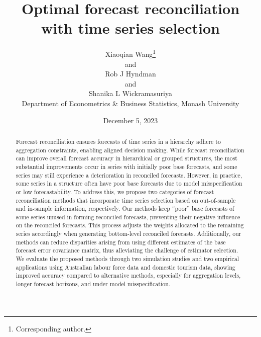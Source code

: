 \documentclass[
  12pt,
  11pt]{article}
\begin{document}
\def\spacingset#1{\renewcommand{\baselinestretch}%
{#1}\small\normalsize} \spacingset{1}

\renewcommand*{\arraystretch}{0.5} %


\date{December 5, 2023}
\title{\bf Optimal forecast reconciliation with time series selection}
\author{
Xiaoqian Wang\thanks{Corresponding author.}\\
and\\Rob J Hyndman\\
and\\Shanika L Wickramasuriya\\
Department of Econometrics \& Business Statistics, Monash University\\
}
\maketitle

\bigskip
\bigskip
\begin{abstract}
Forecast reconciliation ensures forecasts of time series in a hierarchy
adhere to aggregation constraints, enabling aligned decision making.
While forecast reconciliation can improve overall forecast accuracy in
hierarchical or grouped structures, the most substantial improvements
occur in series with initially poor base forecasts, and some series may
still experience a deterioration in reconciled forecasts. However, in
practice, some series in a structure often have poor base forecasts due
to model misspecification or low forecastability. To address this, we
propose two categories of forecast reconciliation methods that
incorporate time series selection based on out-of-sample and in-sample
information, respectively. Our methods keep ``poor'' base forecasts of
some series unused in forming reconciled forecasts, preventing their
negative influence on the reconciled forecasts. This process adjusts the
weights allocated to the remaining series accordingly when generating
bottom-level reconciled forecasts. Additionally, our methods can reduce
disparities arising from using different estimates of the base forecast
error covariance matrix, thus alleviating the challenge of estimator
selection. We evaluate the proposed methods through two simulation
studies and two empirical applications using Australian labour force
data and domestic tourism data, showing improved accuracy compared to
alternative methods, especially for aggregation levels, longer forecast
horizons, and under model misspecification.
\end{abstract}
\end{document}
